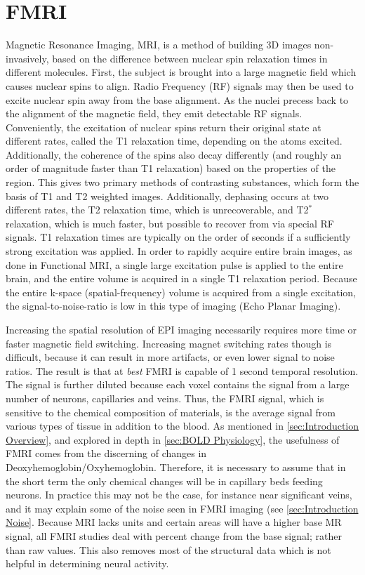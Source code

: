 \section{FMRI}
Magnetic Resonance Imaging, MRI, is a method of building 3D images
non-invasively, based on the difference between nuclear spin
relaxation times in different molecules. First, the subject 
is brought into a large magnetic field which causes nuclear spins
to align. Radio Frequency (RF) signals may
then be used to excite nuclear spin away from the base alignment. 
As the nuclei precess back to the alignment of the magnetic
field, they emit detectable RF signals. Conveniently, the
excitation of nuclear spins return their original state at different
rates, called the T1 relaxation time, depending on the atoms excited.
Additionally, the
coherence of the spins also decay differently (and roughly an order of 
magnitude faster
than T1 relaxation) based on the properties of the region.
This gives two primary methods of contrasting substances,
which form the basis of T1 and T2 weighted images. Additionally, 
dephasing occurs at two different rates, the T2 relaxation time,
which is unrecoverable, and T2$^*$ relaxation, which is
much faster, but possible to recover from via special RF signals.
T1 relaxation times are typically on the order of seconds if 
a sufficiently strong excitation was applied. 
In order to rapidly acquire entire brain images, as done in Functional 
MRI, a single large excitation pulse is applied to the entire brain,
and the entire volume is acquired in a single T1 relaxation period. 
Because the entire k-space (spatial-frequency) volume is acquired 
from a single excitation, the signal-to-noise-ratio is low
in this type of imaging (Echo Planar Imaging). 

Increasing the spatial resolution of EPI imaging necessarily 
requires more time or faster magnetic field switching. Increasing
magnet switching rates though is difficult, because it can result in
more artifacts, or even lower signal to noise ratios. The result is
that at \emph{best} FMRI is capable of 1 second temporal resolution. 
The signal is further diluted because each voxel contains
the signal from a large number of neurons, capillaries and veins. 
Thus, the FMRI signal, which is sensitive to the chemical composition of 
materials, is the average signal from various types of tissue
in addition to the blood. As mentioned in \autoref{sec:Introduction Overview},
and explored in depth in \autoref{sec:BOLD Physiology},
the usefulness of FMRI comes from the discerning of changes in 
Deoxyhemoglobin/Oxyhemoglobin. Therefore, it is necessary to assume
that in the short term the only chemical changes will be in
capillary beds feeding neurons. In practice this may not be the case, for
instance near significant veins, and it may explain some of the
noise seen in FMRI imaging (see \autoref{sec:Introduction Noise}. 
Because MRI lacks units and certain
areas will have a higher base MR signal, all FMRI studies deal with
percent change from the base signal; rather than raw values. This
also removes most of the structural data which is not helpful 
in determining neural activity.

